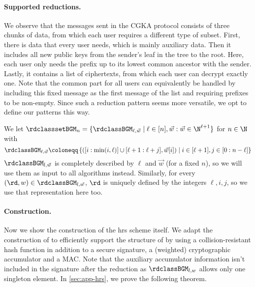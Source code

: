 \paragraph{Supported reductions.}
We observe that the messages sent in the CGKA protocol consists of three chunks of data, from which each user requires a
different type of subset. First, there is data that every user needs, which is mainly auxiliary data. Then it includes
all new public keys from the sender's leaf in the tree to the root. Here, each user only needs the prefix up to its
lowest common ancestor with the sender. Lastly, it contains a list of ciphertexts, from which each user can decrypt
exactly one. Note that the common part for all users can equivalently be handled by including this fixed message as the
first message of the list and requiring prefixes to be non-empty. Since such a reduction pattern seems more versatile,
we opt to define our patterns this way.

\begin{definition}\label{def:red_class}
  We let $\rdclasssetBGM_n = \{\rdclassBGM_{\ell,\vec w} \mid \ell\in[n], \vec w :  \vec w\in\N^{\ell+1}\}$ for $n\in\N$ with
  \begin{equation*}
    \rdclassBGM_{\ell,\vec w} \coloneqq \left\{\left([i:\min(i,\ell)]\cup [\ell + 1:\ell+j], \vec w[i]\right) \mid
      i\in[\ell+1], j\in [0:n-\ell] \right\}
  \end{equation*}
  $\rdclassBGM_{l,\vec w}$ is completely described by $\ell$ and $\vec{w}$ (for a fixed $n$), so we will use them as
  input to all algorithms instead. Similarly, for every $(\rd, w) \in \rdclassBGM_{l,\vec w}$, $\rd$ is uniquely defined
  by the integers $\ell, i, j$, so we use that representation here too.
\end{definition}

\paragraph{Construction.}
Now we show the construction of the \acl{hrs} scheme \ers itself. We adapt the construction of
\cite{ICISC:DPSS15} to efficiently support the structure of  by using a collision-resistant hash
function in addition to a \ufcma secure signature, a (weighted) cryptographic accumulator and a MAC.
Note that the auxiliary accumulator information isn't included in the signature after the reduction as $\rdclassBGM_{l,
  w}$ allows only one singleton element.
In \cref{sec:app-hrs}, we prove the following theorem.

